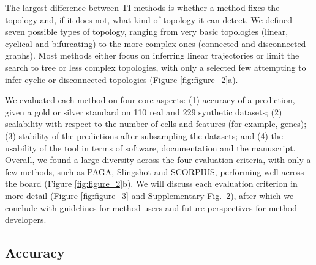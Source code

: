 The largest difference between TI methods is whether a method fixes the topology and, if it does not, what kind of topology it can detect. We defined seven possible types of topology, ranging from very basic topologies (linear, cyclical and bifurcating) to the more complex ones (connected and disconnected graphs). Most methods either focus on inferring linear trajectories or limit the search to tree or less complex topologies, with only a selected few attempting to infer cyclic or disconnected topologies (Figure \ref{fig:figure_2}a).

We evaluated each method on four core aspects: (1) accuracy of a prediction, given a gold or silver standard on 110 real and 229 synthetic datasets; (2) scalability with respect to the number of cells and features (for example, genes); (3) stability of the predictions after subsampling the datasets; and (4) the usability of the tool in terms of software, documentation and the manuscript. Overall, we found a large diversity across the four evaluation criteria, with only a few methods, such as PAGA, Slingshot and SCORPIUS, performing well across the board (Figure \ref{fig:figure_2}b). We will discuss each evaluation criterion in more detail (Figure \ref{fig:figure_3} and Supplementary Fig.~\href{https://github.com/dynverse/dynbenchmark_results/raw/master/08-summary/results_suppfig.pdf}{2}), after which we conclude with guidelines for method users and future perspectives for method developers.


\newpage
\subsection{Accuracy}

